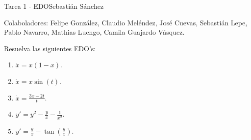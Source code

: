 

\usetikzlibrary{intersections}


{\sc Tarea 1 - EDO\hfill Sebastián Sánchez}

\begin{center}
Colaboladores:
Felipe González,
Claudio Meléndez,
José Cuevas,
Sebastián Lepe,
Pablo Navarro,
Mathias Luengo,
Camila Guajardo Vásquez.
\end{center}

\begin{problema}
Resuelva las siguientes EDO's:
\begin{multicols}{3}
\begin{enumerate}[label=(\alph*)]
\item \(\dot{x} = x(1-x)\).
\item \(\dot{x} = x\sin(t)\).
\item \(\dot{x} = \frac{3x-2t}{t}\).
\item \(y' = y^2 - \frac{y}{x} - \frac{1}{x^2}\).
\item \(y' = \frac{y}{x} - \tan \left(\frac{y}{x}\right)\).
\end{enumerate}
\end{multicols}
\end{problema}
